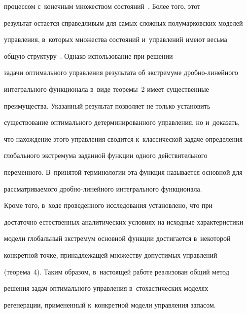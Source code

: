 процессом с~конечным множеством состояний~\cite{20-sh}. Более того, этот 

результат остается справедливым для самых слож\-ных полумарковских моделей 

управления, в~которых множества состояний и~управ\-ле\-ний имеют весьма 

общую структуру~\cite{21-sh, 22-sh}. Однако использование при решении 

задачи оптимального управления результата об экстремуме дроб\-но-ли\-ней\-но\-го 

интегрального функционала в~виде теоремы~2 имеет существенные 

преимущества. Указанный результат позволяет не только установить 

существование оптимального детерминированного управления, но и~доказать, 

что нахождение этого управления сводится к~классической задаче определения 

глобального экстремума заданной функции одного действительного 

переменного. В~принятой терминологии эта функция называется основной для 

рас\-смат\-ри\-ва\-емо\-го дроб\-но-ли\-ней\-но\-го интегрального функционала.



  Кроме того, в~ходе проведенного исследования установлено, что при 

достаточно естественных аналитических условиях на исходные характеристики 

модели глобальный экстремум основной функции достигается в~некоторой 

конкретной точке, принадлежащей множеству допустимых управлений 

(теорема~4). Таким образом, в~настоящей работе реализован общий метод 

решения задач оптимального управления в~стохастических моделях 

регенерации, примененный к~конкретной модели управления запасом.

  

